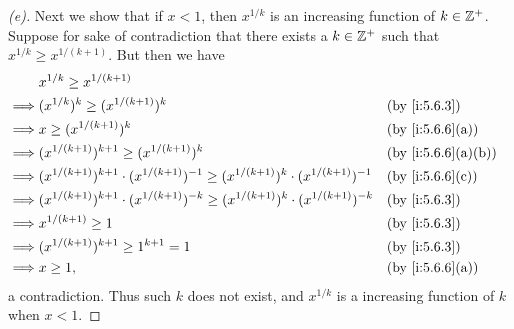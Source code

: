 \begin{proof}[(e)]
  Next we show that if \(x < 1\), then \(x^{1 / k}\) is an increasing function of \(k \in \mathbb{Z}^+\).
  Suppose for sake of contradiction that there exists a \(k \in \mathbb{Z}^+\) such that \(x^{1 / k} \geq x^{1 / (k + 1)}\).
  But then we have
  \begin{align*}
             & x^{1 / k} \geq x^{1 / (k + 1)}                                                                                                      \\
    \implies & (x^{1 / k})^k \geq (x^{1 / (k + 1)})^k                                                                       &  & \by{i:5.6.3}      \\
    \implies & x \geq (x^{1 / (k + 1)})^k                                                                                   &  & \by{i:5.6.6}[a]   \\
    \implies & (x^{1 / (k + 1)})^{k + 1} \geq (x^{1 / (k + 1)})^k                                                           &  & \by{i:5.6.6}[a,b] \\
    \implies & (x^{1 / (k + 1)})^{k + 1} \cdot (x^{1 / (k + 1)})^{-1} \geq (x^{1 / (k + 1)})^k \cdot (x^{1 / (k + 1)})^{-1} &  & \by{i:5.6.6}[c]   \\
    \implies & (x^{1 / (k + 1)})^{k + 1} \cdot (x^{1 / (k + 1)})^{-k} \geq (x^{1 / (k + 1)})^k \cdot (x^{1 / (k + 1)})^{-k} &  & \by{i:5.6.3}      \\
    \implies & x^{1 / (k + 1)} \geq 1                                                                                       &  & \by{i:5.6.3}      \\
    \implies & (x^{1 / (k + 1)})^{k + 1} \geq 1^{k + 1} = 1                                                                 &  & \by{i:5.6.3}      \\
    \implies & x \geq 1,                                                                                                    &  & \by{i:5.6.6}[a]
  \end{align*}
  a contradiction.
  Thus such \(k\) does not exist, and \(x^{1 / k}\) is a increasing function of \(k\) when \(x < 1\).


\end{proof}
